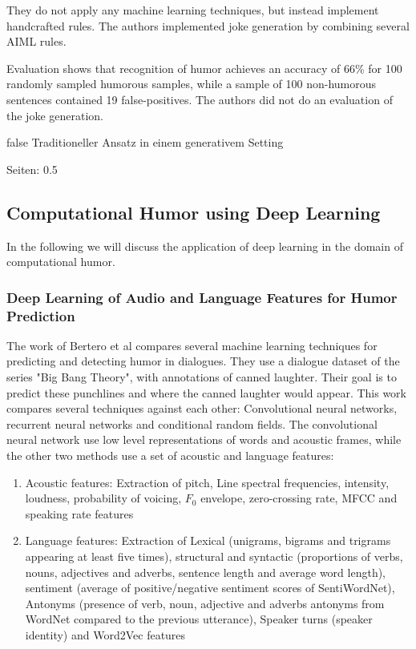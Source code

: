 \documentclass[draft,final,oneside]{vutinfth} %
\begin{document}
They do not apply any machine learning techniques, but instead implement handcrafted rules. The authors implemented joke generation by combining several AIML rules.

Evaluation shows that recognition of humor achieves an accuracy of 66\% for 100 randomly sampled humorous samples, while a sample of 100 non-humorous sentences contained 19 false-positives. The authors did not do an evaluation of the joke generation.


\if false
Traditioneller Ansatz in einem generativem Setting

\cite{HumoristBot}

Seiten: 0.5
\fi

\subsection{Computational Humor using Deep Learning}

In the following we will discuss the application of deep learning in the domain of computational humor. 

\subsubsection{Deep Learning of Audio and Language Features for Humor Prediction \cite{Bertero2016DeepLO}}

The work of Bertero et al compares several machine learning techniques for predicting and detecting humor in dialogues. They use a dialogue dataset of the series "Big Bang Theory", with annotations of canned laughter. Their goal is to predict these punchlines and where the canned laughter would appear. This work compares several techniques against each other: Convolutional neural networks, recurrent neural networks and conditional random fields. The convolutional neural network use low level representations of words and acoustic frames, while the other two methods use a set of acoustic and language features:

\begin{enumerate}
\item Acoustic features: Extraction of pitch, Line spectral frequencies, intensity, loudness, probability of voicing, $F_0$ envelope, zero-crossing rate, MFCC and speaking rate features
\item Language features: Extraction of Lexical (unigrams, bigrams and trigrams appearing at least five times), structural and syntactic (proportions of verbs, nouns, adjectives and adverbs, sentence length and average word length), sentiment (average of positive/negative sentiment scores of SentiWordNet), Antonyms (presence of verb, noun, adjective and adverbs antonyms from WordNet compared to the previous utterance), Speaker turns (speaker identity) and Word2Vec features
\end{enumerate}
\end{document}
